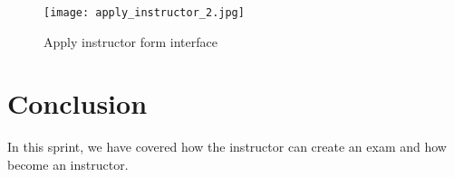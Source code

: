 \hfill \break
\hfill \break
\hfill \break
\hfill \break

\begin{figure}[!ht]
    \centering
    \texttt{[image: apply\_instructor\_2.jpg]}
    \caption{Apply instructor form interface}
    \label{fig:apply_instructor_2}
\end{figure}


\vfill
\clearpage

\section*{Conclusion}
In this sprint, we have covered how the instructor can create an exam and how become an instructor.

